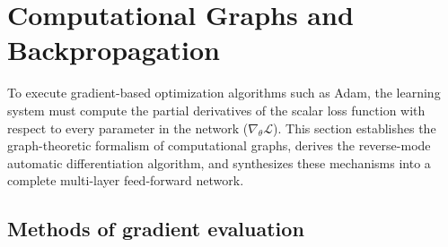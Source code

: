 \documentclass[../../main.tex]{subfiles}
\begin{document}
\clearpage
\section{Computational Graphs and Backpropagation}
\label{sec:computational_graphs_ffn}

To execute gradient-based optimization algorithms such as Adam, the learning system must compute the partial derivatives of the scalar loss function with respect to every parameter in the network ($\nabla_\theta \mathcal{L}$). This section establishes the graph-theoretic formalism of computational graphs, derives the reverse-mode automatic differentiation algorithm, and synthesizes these mechanisms into a complete multi-layer feed-forward network.

\subsection{Methods of gradient evaluation}
\label{subsec:gradient_evaluation_methods}
\end{document}
